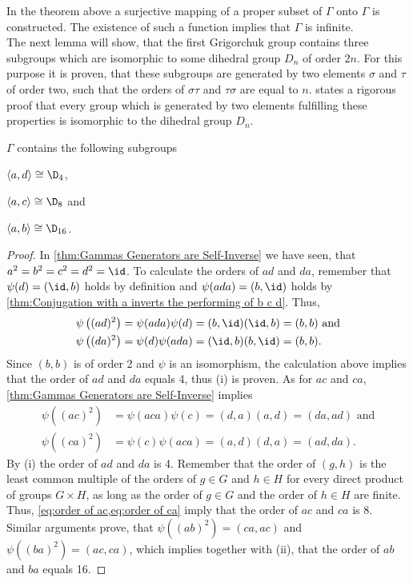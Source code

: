 In the theorem above a surjective mapping of a proper subset of $\Gamma$ onto $\Gamma$ is constructed. The existence of such a function implies that $\Gamma$ is infinite.\\
The next lemma will show, that the first Grigorchuk group contains three subgroups which are isomorphic to some dihedral group $D_n$ of order $2n$. For this purpose it is proven, that these subgroups are generated by two elements $\sigma$ and $\tau$ of order two, such that the orders of $\sigma\tau$ and $\tau\sigma$ are equal to $n$. \textcite[Thm. 6.8]{suzuki1982group} states a rigorous proof that every group which is generated by two elements fulfilling these properties is isomorphic to the dihedral group $D_n$.
\begin{lem}\label{thm:Dihedral groups in Gamma}
$\Gamma$ contains the following subgroups
\begin{thmlist}
\item $\langle a,d\rangle\cong\D_4$,\label{thm:D4}
\item $\langle a,c\rangle\cong\D_8$ and
\item $\langle a,b\rangle\cong\D_{16}$.\label{thm:D16}
\end{thmlist}
\end{lem}
\begin{proof}
In \cref{thm:Gammas Generators are Self-Inverse} we have seen, that $a^2=b^2=c^2=d^2=\id$. To calculate the orders of $ad$ and $da$, remember that $\psi(d)=(\id,b)$ holds by definition and $\psi(ada)=(b,\id)$ holds by \cref{thm:Conjugation with a inverts the performing of b c d}. Thus,
\begin{align*}
\psi\left((ad)^2\right)&=\psi(ada)\psi(d)=(b,\id)(\id,b)=(b,b) \text{ and}\\
\psi\left((da)^2\right)&=\psi(d)\psi(ada)=(\id,b)(b,\id)=(b,b).
\end{align*}
Since $(b,b)$ is of order 2 and $\psi$ is an isomorphism, the calculation above implies that the order of $ad$ and $da$ equals 4, thus (i) is proven. As for $ac$ and $ca$, \cref{thm:Gammas Generators are Self-Inverse} implies
\begin{align}
\psi\left((ac)^2\right)&=\psi(aca)\psi(c)=(d,a)(a,d)=(da,ad) \text{ and}\label{eq:order of ac} \\ 
\psi\left((ca)^2\right)&=\psi(c)\psi(aca)=(a,d)(d,a)=(ad,da).\label{eq:order of ca}
\end{align} 
By (i) the order of $ad$ and $da$ is 4. Remember that the order of $(g,h)$ is the least common multiple of the orders of $g\in G$ and $h\in H$ for every direct product of groups $G\times H$, as long as the order of $g\in G$ and the order of $h\in H$ are finite. Thus, \cref{eq:order of ac,eq:order of ca} imply that the order of $ac$ and $ca$ is 8. Similar arguments prove, that $\psi\left((ab)^2\right)=(ca,ac)$ and $\psi\left((ba)^2\right)=(ac,ca)$, which implies together with (ii), that the order of $ab$ and $ba$ equals 16. 
\end{proof}
